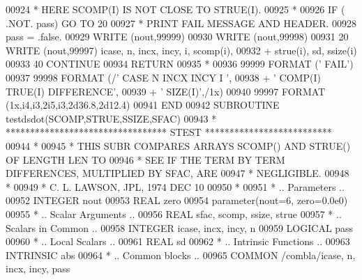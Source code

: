 \begin{DoxyCode}
00924 \textcolor{comment}{*                             HERE    SCOMP(I) IS NOT CLOSE TO STRUE(I).}
00925 \textcolor{comment}{*}
00926          \textcolor{keywordflow}{IF} ( .NOT. pass) \textcolor{keywordflow}{GO TO} 20
00927 \textcolor{comment}{*                             PRINT FAIL MESSAGE AND HEADER.}
00928          pass = .false.
00929          \textcolor{keyword}{WRITE} (nout,99999)
00930          \textcolor{keyword}{WRITE} (nout,99998)
00931    20    \textcolor{keyword}{WRITE} (nout,99997) icase, n, incx, incy, i, scomp(i),
00932      +     strue(i), sd, ssize(i)
00933    40 \textcolor{keywordflow}{CONTINUE}
00934       \textcolor{keywordflow}{RETURN}
00935 \textcolor{comment}{*}
00936 99999 \textcolor{keyword}{FORMAT} (\textcolor{stringliteral}{'                                       FAIL'})
00937 99998 \textcolor{keyword}{FORMAT} (/\textcolor{stringliteral}{' CASE  N INCX INCY  I                            '},
00938      +       \textcolor{stringliteral}{' COMP(I)                             TRUE(I)  DIFFERENCE'},
00939      +       \textcolor{stringliteral}{'     SIZE(I)'},/1x)
00940 99997 \textcolor{keyword}{FORMAT} (1x,i4,i3,2i5,i3,2d36.8,2d12.4)
00941 \textcolor{keyword}{      END}
00942 \textcolor{keyword}{      SUBROUTINE }testdsdot(SCOMP,STRUE,SSIZE,SFAC)
00943 \textcolor{comment}{*     ********************************* STEST **************************}
00944 \textcolor{comment}{*}
00945 \textcolor{comment}{*     THIS SUBR COMPARES ARRAYS  SCOMP() AND STRUE() OF LENGTH LEN TO}
00946 \textcolor{comment}{*     SEE IF THE TERM BY TERM DIFFERENCES, MULTIPLIED BY SFAC, ARE}
00947 \textcolor{comment}{*     NEGLIGIBLE.}
00948 \textcolor{comment}{*}
00949 \textcolor{comment}{*     C. L. LAWSON, JPL, 1974 DEC 10}
00950 \textcolor{comment}{*}
00951 \textcolor{comment}{*     .. Parameters ..}
00952       \textcolor{keywordtype}{INTEGER}          nout
00953       \textcolor{keywordtype}{REAL}             zero
00954       parameter(nout=6, zero=0.0e0)
00955 \textcolor{comment}{*     .. Scalar Arguments ..}
00956       \textcolor{keywordtype}{REAL}             sfac, scomp, ssize, strue
00957 \textcolor{comment}{*     .. Scalars in Common ..}
00958       \textcolor{keywordtype}{INTEGER}          icase, incx, incy, n
00959       \textcolor{keywordtype}{LOGICAL}          pass
00960 \textcolor{comment}{*     .. Local Scalars ..}
00961       \textcolor{keywordtype}{REAL}             sd
00962 \textcolor{comment}{*     .. Intrinsic Functions ..}
00963       \textcolor{keywordtype}{INTRINSIC}        abs
00964 \textcolor{comment}{*     .. Common blocks ..}
00965       \textcolor{keyword}{COMMON}           /combla/icase, n, incx, incy, pass

\end{DoxyCode}
